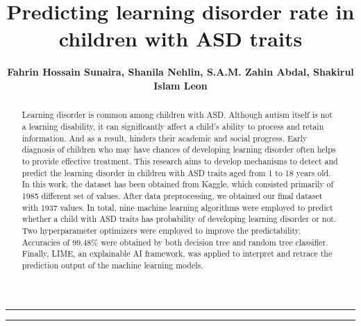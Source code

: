 \documentclass{article}
\title{\textbf{Predicting learning disorder rate in children with ASD traits}}
\author{\textbf{Fahrin Hossain Sunaira, Shanila Nehlin, S.A.M. Zahin Abdal, Shakirul Islam Leon}}
\affil{Department of Electrical and Computer Engineering, North South University, Dhaka, 1229, Bangladesh}
\date{}
\begin{document}
\maketitle

\hrule
\begin{abstract}
\noindent Learning disorder is common among children with ASD. Although autism itself is not a learning disability, it can significantly affect a child’s ability to process and retain information. And as a result, hinders their academic and social progress. Early diagnosis of children who may have chances of developing learning disorder often helps to provide effective treatment. This research aims to develop mechanisms to detect and predict the learning disorder in children with ASD traits aged from 1 to 18 years old. In this work, the dataset has been obtained from Kaggle, which consisted primarily of 1985 different set of values. After data preprocessing, we obtained our final dataset with 1937 values. In total, nine machine learning algorithms were employed to predict whether a child with ASD traits has probability of developing learning disorder or not. Two hyperparameter optimizers were employed to improve the predictability. Accuracies of 99.48\% were obtained by both decision tree and random tree classifier. Finally, LIME, an explainable AI framework, was applied to interpret and retrace the prediction output of the machine learning models.
\vspace{\baselineskip}
\end{abstract}
\hrule
\vspace{3\baselineskip}
\setlength{\parindent}{24pt}
\end{document}
